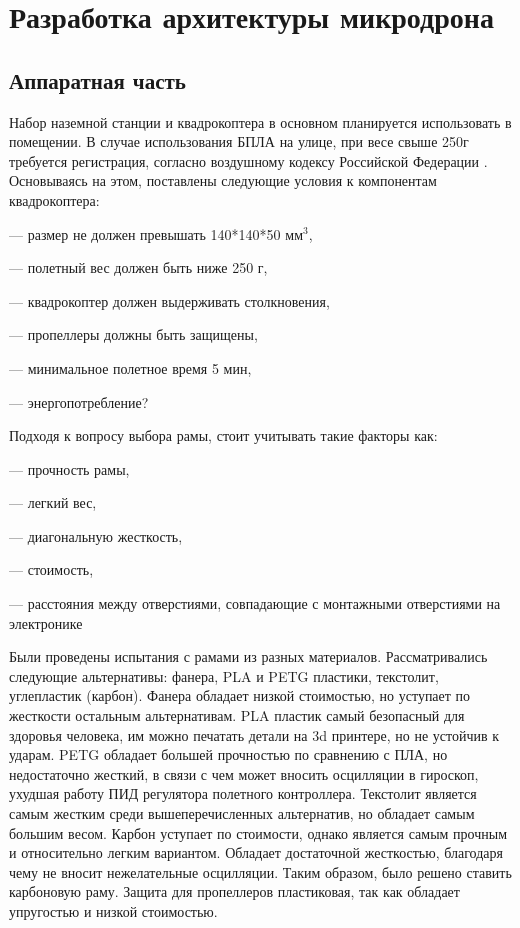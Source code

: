 
\section{Разработка архитектуры микродрона}
\subsection{Аппаратная часть}

Набор наземной станции и квадрокоптера в основном планируется использовать в помещении. В случае использования БПЛА на улице, при весе свыше 250г требуется регистрация, согласно воздушному кодексу Российской Федерации\cite{ivp} . Основываясь на этом, поставлены следующие условия к компонентам квадрокоптера:

--- размер не должен превышать 140*140*50 \(мм^3\),

--- полетный вес должен быть ниже 250 г,

--- квадрокоптер должен выдерживать столкновения,

--- пропеллеры должны быть защищены,

--- минимальное полетное время 5 мин,

--- энергопотребление?

Подходя к вопросу выбора рамы, стоит учитывать такие факторы как:

--- прочность рамы,

--- легкий вес,

--- диагональную жесткость,

--- стоимость,

--- расстояния между отверстиями, совпадающие с монтажными отверстиями на электронике

Были проведены испытания с рамами из разных материалов. Рассматривались следующие альтернативы: фанера, PLA и PETG пластики, текстолит, углепластик (карбон). Фанера обладает низкой стоимостью, но уступает по жесткости остальным альтернативам. PLA пластик самый безопасный для здоровья человека, им можно печатать детали на 3d принтере, но не устойчив к ударам. PETG обладает большей прочностью по сравнению с ПЛА, но недостаточно жесткий, в связи с чем может вносить осцилляции в гироскоп, ухудшая работу ПИД регулятора полетного контроллера. Текстолит является самым жестким среди вышеперечисленных альтернатив, но обладает самым большим весом. Карбон уступает по стоимости, однако является самым прочным и относительно легким вариантом. Обладает достаточной жесткостью, благодаря чему не вносит нежелательные осцилляции. Таким образом, было решено ставить карбоновую раму.
Защита для пропеллеров пластиковая, так как обладает упругостью и низкой стоимостью.

